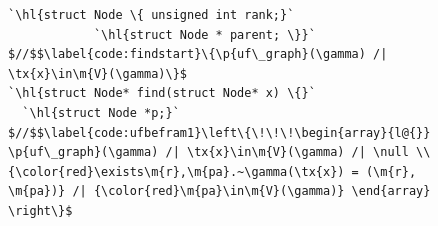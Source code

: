 \documentclass[acmsmall,screen]{acmart}  %
\newcommand{\tx}[1]{\text{#1}}
\newcommand{\p}[1]{\ensuremath{\mathsf{#1}}} \newcommand{\m}[1]{\ensuremath{\mathit{#1}}} \newcommand{\ma}[1]{\ensuremath{\mathcal{#1}}} \let\ramify\lightning
\newcommand{\hl}[1]{\colorbox{lightgray}{#1}} %
\providecommand{\DIFaddbeginFL}{} %
\providecommand{\DIFdelendFL}{} %
\newcommand{\DIFaddincludegraphics}[2][]{{\color{blue}\fbox{\DIFOincludegraphics[#1]{#2}}}} %
\DeclareRobustCommand{\DIFaddbeginFL}{\DIFOaddbeginFL \let\includegraphics\DIFaddincludegraphics} %
\DeclareRobustCommand{\DIFdelendFL}{\DIFOaddendFL \let\includegraphics\DIFOincludegraphics} %
\begin{document}
\begin{figure}[t]
\DIFdelendFL \DIFaddbeginFL \begin{lstlisting}[multicols=2]
`\hl{struct Node \{ unsigned int rank;}`
            `\hl{struct Node * parent; \}}`
$//$$\label{code:findstart}\{\p{uf\_graph}(\gamma) /| \tx{x}\in\m{V}(\gamma)\}$
`\hl{struct Node* find(struct Node* x) \{}`
  `\hl{struct Node *p;}`
$//$$\label{code:ufbefram1}\left\{\!\!\!\begin{array}{l@{}} \p{uf\_graph}(\gamma) /| \tx{x}\in\m{V}(\gamma) /| \null \\ {\color{red}\exists\m{r},\m{pa}.~\gamma(\tx{x}) = (\m{r}, \m{pa})} /| {\color{red}\m{pa}\in\m{V}(\gamma)} \end{array} \right\}$

\end{lstlisting}
\end{figure}
\end{document}
